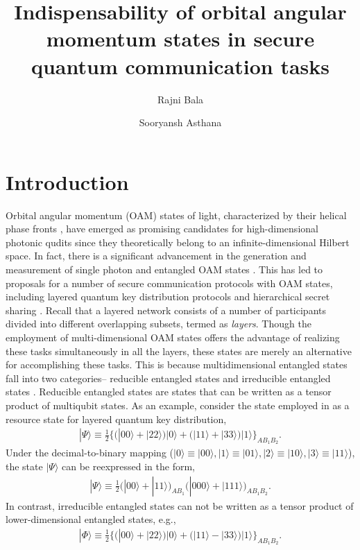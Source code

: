 \documentclass[fleqn,10pt]{wlscirep}
\title{Indispensability of orbital angular momentum states in secure quantum communication tasks}
\author[1*]{Rajni Bala}
\author[1]{Sooryansh Asthana}
\affil[1]{Department of Physics, Indian Institute of Technology Delhi, New Delhi-110016, India}
\affil[*]{Rajni.Bala@physics.iitd.ac.in}
\begin{document}
\flushbottom
\maketitle

\thispagestyle{empty}


\section*{Introduction}
\label{intro}
Orbital angular momentum (OAM) states of light, characterized by their helical phase fronts \cite{allen1992orbital, mair2001entanglement}, have emerged as promising candidates for high-dimensional photonic qudits since they theoretically belong to an infinite-dimensional Hilbert space. In fact, there is a significant advancement in the generation and measurement of single photon and entangled OAM states \cite{erhard2018twisted,willner2021orbital,d2013test}. This has led to proposals for a number of secure communication protocols with OAM states,  including layered quantum key distribution protocols and hierarchical secret sharing \cite{mirhosseini2015high, mafu2013higher,  pivoluska2018layered, bala2023quantum, sit2017high,hillery1999quantum,qin2020hierarchical,sekga2023measurement}. Recall that a layered network consists of a number of participants divided into different overlapping subsets, termed as {\it layers}.
Though the employment of multi-dimensional OAM states offers the advantage of realizing these tasks simultaneously in all the layers, these states are merely an alternative for accomplishing these tasks. This is because multidimensional entangled states fall into two categories-- reducible entangled states and irreducible entangled states \cite{kraft2018characterizing,cong2017witnessing}. Reducible entangled states are states that can be written as a tensor product of multiqubit states. As an example, consider the state employed in \cite{pivoluska2018layered} as a resource state for layered quantum key distribution, 
\begin{align}
    |\Psi\rangle\equiv\frac{1}{2}\Big\{\Big(|00\rangle+|22\rangle\Big)|0\rangle+\Big(|11\rangle+|33\rangle\Big)|1\rangle\Big\}_{AB_1B_2}.
\end{align}
Under the decimal-to-binary mapping ($|0\rangle\equiv |00\rangle, |1\rangle\equiv |01\rangle, |2\rangle\equiv |10\rangle, |3\rangle\equiv |11\rangle$), the state $|\Psi\rangle$ can be reexpressed in the form,
\begin{align}
|\Psi\rangle\equiv \frac{1}{{2}}\Big(|00\rangle+|11\rangle\Big)_{AB_1}\Big(|000\rangle+|111\rangle\Big)_{AB_1B_2}.
\end{align}
In contrast, irreducible entangled states can not be written as a tensor product of lower-dimensional entangled states, e.g., 
\begin{align}
|\Phi\rangle\equiv \frac{1}{2}\Big\{\Big(|00\rangle+|22\rangle\Big)|0\rangle+\Big(|11\rangle-|33\rangle\Big)|1\rangle\Big\}_{AB_1B_2}.
\end{align}
\end{document}
